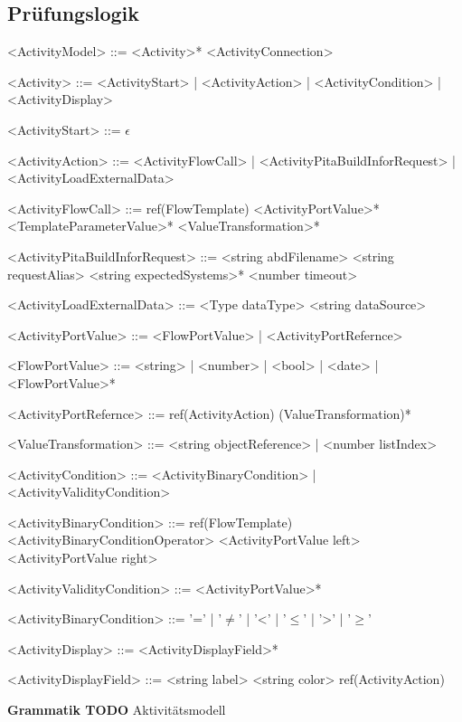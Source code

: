 \documentclass{article}
\begin{document}
    \subsection{Prüfungslogik}
    \begin{grammar}
        <ActivityModel> ::= <Activity>* <ActivityConnection>

        <Activity> ::= <ActivityStart>
        | <ActivityAction>
        | <ActivityCondition>
        | <ActivityDisplay>

        <ActivityStart> ::= $\epsilon$

        <ActivityAction> ::= <ActivityFlowCall>
        | <ActivityPitaBuildInforRequest>
        | <ActivityLoadExternalData>

        <ActivityFlowCall> ::= ref(FlowTemplate) <ActivityPortValue>* <TemplateParameterValue>* <ValueTransformation>*

        <ActivityPitaBuildInforRequest> ::= <string abdFilename> <string requestAlias> <string expectedSystems>* <number timeout>

        <ActivityLoadExternalData> ::= <Type dataType> <string dataSource>

        <ActivityPortValue> ::= <FlowPortValue>
        | <ActivityPortRefernce>

        <FlowPortValue> ::= <string>
        | <number>
        | <bool>
        | <date>
        | <FlowPortValue>*

        <ActivityPortRefernce> ::= ref(ActivityAction) (ValueTransformation)*

        <ValueTransformation> ::= <string objectReference>
        | <number listIndex>

        <ActivityCondition> ::= <ActivityBinaryCondition>
        | <ActivityValidityCondition>

        <ActivityBinaryCondition> ::= ref(FlowTemplate) <ActivityBinaryConditionOperator> <ActivityPortValue left> <ActivityPortValue right>

        <ActivityValidityCondition> ::= <ActivityPortValue>*

        <ActivityBinaryCondition> ::= '='
        | '$\neq$' 
        | '\textless' 
        | '$\leq$' 
        | '\textgreater' 
        | '$\geq$'

        <ActivityDisplay> ::= <ActivityDisplayField>*

        <ActivityDisplayField> ::= <string label> <string color> ref(ActivityAction)
    \end{grammar}
    \textbf{Grammatik TODO} Aktivitätsmodell
    \newpage
\end{document}
